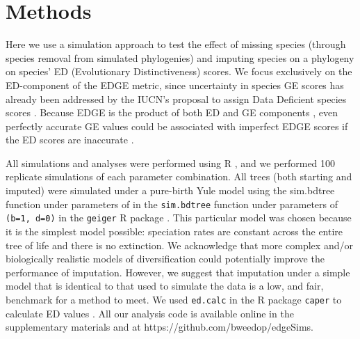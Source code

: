 \documentclass[12pt,english]{article}
\begin{document}
\section*{Methods}

Here we use a simulation approach to test the effect of missing species (through
species removal from simulated phylogenies) and imputing species on a phylogeny
on species’ ED (Evolutionary Distinctiveness) scores. We focus exclusively on
the ED-component of the EDGE metric, since uncertainty in species GE scores has
already been addressed by the IUCN’s proposal to assign Data Deficient species
scores \autocite{Iucn2001, Iucn2008}. Because EDGE is the product of both ED and
GE components \autocite[see]{Isaac2007}, even perfectly accurate GE values could
be associated with imperfect EDGE scores if the ED scores are inaccurate .


All simulations and analyses were performed using R \autocite[version
3.4.0;][]{R2017}, and we performed 100 replicate simulations of each parameter
combination. All trees (both starting and imputed) were simulated under a
pure-birth Yule model using the sim.bdtree function under parameters of in the
\texttt{sim.bdtree} function under parameters of \texttt{(b=1, d=0)} in the
\texttt{geiger} R package \autocite{Pennell2014}. This particular model was
chosen because it is the simplest model possible: speciation rates are constant
across the entire tree of life and there is no extinction. We acknowledge that
more complex and/or biologically realistic models of diversification could
potentially improve the performance of imputation. However, we suggest that
imputation under a simple model that is identical to that used to simulate the
data is a low, and fair, benchmark for a method to meet. We used
\texttt{ed.calc} in the R package \texttt{caper} to calculate ED values
\autocite{Orme2013}. All our analysis code is available online in the
supplementary materials and at https://github.com/bweedop/edgeSims.
\end{document}
